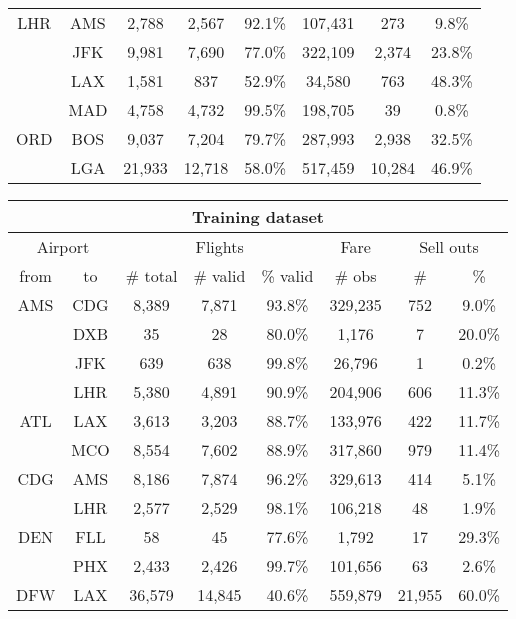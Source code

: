 \begin{center}
\begin{tabular}{c c | c c c | c | c c}
LHR  &  AMS  &  2,788  &  2,567  &  92.1\%  &  107,431  &  273  &  9.8\% \\
~  &  JFK  &  9,981  &  7,690  &  77.0\%  &  322,109  &  2,374  &  23.8\% \\
~  &  LAX  &  1,581  &  837  &  52.9\%  &  34,580  &  763  &  48.3\% \\
~  &  MAD  &  4,758  &  4,732  &  99.5\%  &  198,705  &  39  &  0.8\% \\[.5ex]
ORD  &  BOS  &  9,037  &  7,204  &  79.7\%  &  287,993  &  2,938  &  32.5\% \\
~  &  LGA  &  21,933  &  12,718  &  58.0\%  &  517,459  &  10,284  &  46.9\% \\
\bottomrule
\end{tabular}
\end{center}

\begin{center}
\footnotesize
\begin{tabular}{c c | c c c | c | c c}
\toprule
\multicolumn{8}{c}{\normalsize Training dataset} \\
\midrule
\multicolumn{2}{c|}{Airport}  & \multicolumn{3}{c|}{Flights} & Fare & \multicolumn{2}{c}{Sell outs} \\[.4ex]
from &  to  & \# total  & \# valid  & \% valid  &  \# obs  &  \#  &  \% \\
\midrule
AMS  &  CDG  &  8,389  &  7,871  &  93.8\%  &  329,235  &  752  &  9.0\% \\
~  &  DXB  &  35  &  28  &  80.0\%  &  1,176  &  7  &  20.0\% \\
~  &  JFK  &  639  &  638  &  99.8\%  &  26,796  &  1  &  0.2\% \\
~  &  LHR  &  5,380  &  4,891  &  90.9\%  &  204,906  &  606  &  11.3\% \\[.5ex]
ATL  &  LAX  &  3,613  &  3,203  &  88.7\%  &  133,976  &  422  &  11.7\% \\
~  &  MCO  &  8,554  &  7,602  &  88.9\%  &  317,860  &  979  &  11.4\% \\[.5ex]
CDG  &  AMS  &  8,186  &  7,874  &  96.2\%  &  329,613  &  414  &  5.1\% \\
~  &  LHR  &  2,577  &  2,529  &  98.1\%  &  106,218  &  48  &  1.9\% \\[.5ex]
DEN  &  FLL  &  58  &  45  &  77.6\%  &  1,792  &  17  &  29.3\% \\
~  &  PHX  &  2,433  &  2,426  &  99.7\%  &  101,656  &  63  &  2.6\% \\[.5ex]
DFW  &  LAX  &  36,579  &  14,845  &  40.6\%  &  559,879  &  21,955  &  60.0\% \\

\end{tabular}
\end{center}

